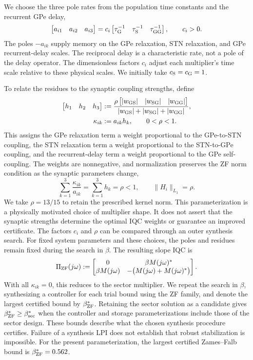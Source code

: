 We choose the three pole rates from the population time constants and
the recurrent GPe delay,
\begin{equation}\label{eq:stn-gpe-zf-coefficients}
\begin{bmatrix}a_{i1}&a_{i2}&a_{i3}\end{bmatrix}
=c_i\begin{bmatrix}\tau_{{\mathrm{G}}}^{-1}&\tau_{{\mathrm{S}}}^{-1}&\tau_{{\mathrm{GG}}}^{-1}\end{bmatrix},
\qquad c_i>0.
\end{equation}
The poles $-a_{ik}$ supply memory on the GPe relaxation, STN relaxation,
and GPe recurrent-delay scales. The reciprocal delay is a characteristic
rate, not a pole of the delay operator. The dimensionless factors $c_i$
adjust each multiplier's time scale relative to these physical scales.
We initially take $c_{{\mathrm{S}}}=c_{{\mathrm{G}}}=1$.

To relate the residues to the synaptic coupling strengths, define
\begin{equation*}
\begin{aligned}
\begin{bmatrix}h_1&h_2&h_3\end{bmatrix}
&:=\frac{\rho\begin{bmatrix}|w_{{\mathrm{GS}}}|&|w_{{\mathrm{SG}}}|&|w_{{\mathrm{GG}}}|\end{bmatrix}}
{|w_{{\mathrm{GS}}}|+|w_{{\mathrm{SG}}}|+|w_{{\mathrm{GG}}}|},\\
\kappa_{ik}&:=a_{ik}h_k,\qquad 0<\rho<1.
\end{aligned}
\end{equation*}
This assigns the GPe relaxation term a weight proportional to the
GPe-to-STN coupling, the STN relaxation term a weight proportional to
the STN-to-GPe coupling, and the recurrent-delay term a weight
proportional to the GPe self-coupling. The weights are nonnegative,
and normalization preserves the ZF norm condition as the synaptic
parameters change,
\begin{equation*}
\sum_{k=1}^{3}\frac{\kappa_{ik}}{a_{ik}}
=\sum_{k=1}^{3}h_k=\rho<1,
\qquad\|H_i\|_{L_1}=\rho.
\end{equation*}
We take $\rho=13/15$ to retain the prescribed kernel norm. This
parameterization is a physically motivated choice of multiplier shape.
It does not assert that the synaptic strengths determine the optimal
IQC weights or guarantee an improved certificate. The factors $c_i$
and $\rho$ can be compared through an outer synthesis search. For
fixed system parameters and these choices, the poles and residues
remain fixed during the search in $\beta$. The resulting slope IQC is
\begin{equation}\label{eq:stn-gpe-zf-multiplier}
\Pi_{{\mathrm{ZF}}}(j\omega):=\begin{bmatrix}
0&\beta M(j\omega)^*\\
\beta M(j\omega)&-\bigl(M(j\omega)+M(j\omega)^*\bigr)\end{bmatrix}.
\end{equation}
With all $\kappa_{ik}=0$, this reduces to the sector multiplier. We repeat
the search in $\beta$, synthesizing a controller for each trial bound
using the ZF family, and denote the largest certified bound by
$\beta_{{\mathrm{ZF}}}^*$. Retaining the sector solution as a candidate gives
$\beta_{{\mathrm{ZF}}}^*\geq\beta_{{\mathrm{sec}}}^*$ when the controller and
storage parameterizations include those of the sector design. These
bounds describe what the chosen synthesis procedure certifies. Failure
of a synthesis LPI does not establish that robust stabilization is
impossible.
For the present parameterization, the largest certified Zames--Falb bound is
$\beta_{{\mathrm{ZF}}}^*=0.562$.

